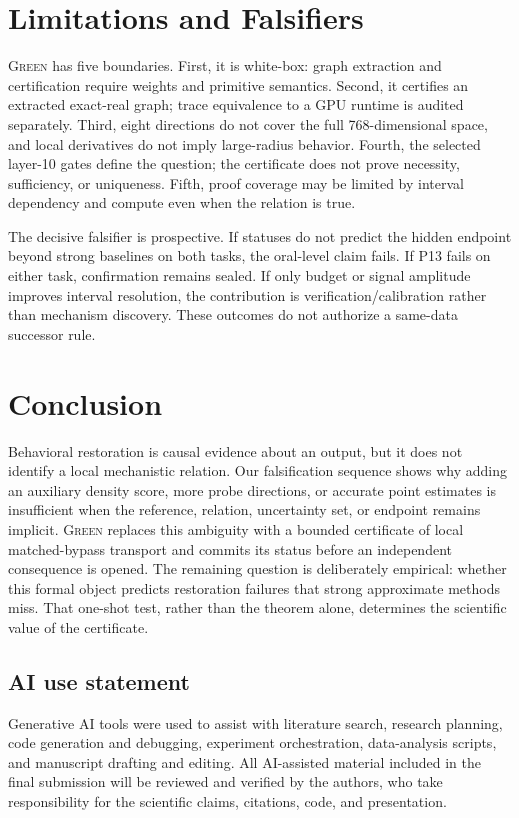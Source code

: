 \documentclass{article}
\newcommand{\green}{\textsc{Green}}
\begin{document}
\section{Limitations and Falsifiers}
\label{sec:limitations}

\green{} has five boundaries. First, it is white-box: graph extraction and certification require weights and primitive semantics. Second, it certifies an extracted exact-real graph; trace equivalence to a GPU runtime is audited separately. Third, eight directions do not cover the full 768-dimensional space, and local derivatives do not imply large-radius behavior. Fourth, the selected layer-10 gates define the question; the certificate does not prove necessity, sufficiency, or uniqueness. Fifth, proof coverage may be limited by interval dependency and compute even when the relation is true.

The decisive falsifier is prospective. If statuses do not predict the hidden endpoint beyond strong baselines on both tasks, the oral-level claim fails. If P13 fails on either task, confirmation remains sealed. If only budget or signal amplitude improves interval resolution, the contribution is verification/calibration rather than mechanism discovery. These outcomes do not authorize a same-data successor rule.

\section{Conclusion}
Behavioral restoration is causal evidence about an output, but it does not identify a local mechanistic relation. Our falsification sequence shows why adding an auxiliary density score, more probe directions, or accurate point estimates is insufficient when the reference, relation, uncertainty set, or endpoint remains implicit. \green{} replaces this ambiguity with a bounded certificate of local matched-bypass transport and commits its status before an independent consequence is opened. The remaining question is deliberately empirical: whether this formal object predicts restoration failures that strong approximate methods miss. That one-shot test, rather than the theorem alone, determines the scientific value of the certificate.

\subsection*{AI use statement}
Generative AI tools were used to assist with literature search, research planning, code generation and debugging, experiment orchestration, data-analysis scripts, and manuscript drafting and editing. All AI-assisted material included in the final submission will be reviewed and verified by the authors, who take responsibility for the scientific claims, citations, code, and presentation.
\end{document}
